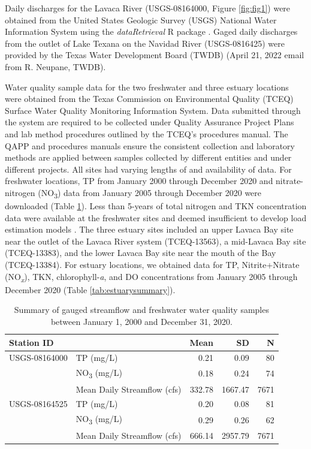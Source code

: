\documentclass[water,article,submit,oneauthor]{Definitions/mdpi}
\begin{document}
Daily discharges for the Lavaca River (USGS-08164000, Figure
\ref{fig:fig1}) were obtained from the United States Geologic Survey
(USGS) National Water Information System using the \emph{dataRetrieval}
R package \citep{deciccoDataRetrievalPackagesDiscovering2022}. Gaged
daily discharges from the outlet of Lake Texana on the Navidad River
(USGS-0816425) were provided by the Texas Water Development Board (TWDB)
(April 21, 2022 email from R. Neupane, TWDB).

Water quality sample data for the two freshwater and three estuary
locations were obtained from the Texas Commission on Environmental
Quality (TCEQ) Surface Water Quality Monitoring Information System. Data
submitted through the system are required to be collected under Quality
Assurance Project Plans and lab method procedures outlined by the TCEQ's
procedures manual. The QAPP and procedures manuals ensure the consistent
collection and laboratory methods are applied between samples collected
by different entities and under different projects. All sites had
varying lengths of and availability of data. For freshwater locations,
TP from January 2000 through December 2020 and nitrate-nitrogen
(NO\textsubscript{3}) data from January 2005 through December 2020 were
downloaded (Table \ref{tab:fwsummary}). Less than 5-years of total
nitrogen and TKN concentration data were available at the freshwater
sites and deemed insufficient to develop load estimation models
\citep{horowitzEvaluationSedimentRating2003, snelderEstimationCatchmentNutrient2017}.
The three estuary sites included an upper Lavaca Bay site near the
outlet of the Lavaca River system (TCEQ-13563), a mid-Lavaca Bay site
(TCEQ-13383), and the lower Lavaca Bay site near the mouth of the Bay
(TCEQ-13384). For estuary locations, we obtained data for TP,
Nitrite+Nitrate (NO\emph{\textsubscript{x}}), TKN, chlorophyll-\emph{a},
and DO concentrations from January 2005 through December 2020 (Table
\ref{tab:estuarysummary}).

\begin{table}[H]

\caption{\label{tab:fwsummary}Summary of gauged streamflow and freshwater water quality samples between January 1, 2000 and December 31, 2020.}
\centering
\begin{tabular}[t]{llrrr}
\toprule
Station ID &   & Mean & SD & N\\
\midrule
USGS-08164000 & TP (mg/L) & \num{0.21} & \num{0.09} & 80\\
 & NO\textsubscript{3} (mg/L) & \num{0.18} & \num{0.24} & 74\\
 & Mean Daily Streamflow (cfs) & \num{332.78} & \num{1667.47} & 7671\\
USGS-08164525 & TP (mg/L) & \num{0.20} & \num{0.08} & 81\\
 & NO\textsubscript{3} (mg/L) & \num{0.29} & \num{0.26} & 62\\
 & Mean Daily Streamflow (cfs) & \num{666.14} & \num{2957.79} & 7671\\
\bottomrule
\end{tabular}
\end{table}
\end{document}
